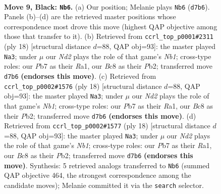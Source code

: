 \documentclass[11pt]{article}
\begin{document}
\clearpage

\begin{figure}[p]\centering
\begin{subfigure}{0.46\textwidth}\centering
\resizebox{\linewidth}{!}{%
\newchessgame
\chessboard[
  setfen={rnb2rk1/pppn1ppp/4p3/3pP3/1q1P2PP/2N5/PPP2P2/1R1QKBNR b K - 0 9},
  showmover=false,
  pgfstyle=straightmove, color=movearrow, markmove={d7-b6}
]}
\caption{}
\end{subfigure}\hfill
\begin{subfigure}{0.46\textwidth}\centering
\resizebox{\linewidth}{!}{%
\newchessgame
\chessboard[
  setfen={1rbqk2r/ppp2ppp/2n1p3/8/QnpP4/5NP1/PP2PPBP/RN3RK1 w k - 2 10},
  showmover=false,
  pgfstyle=straightmove, color=movearrow, markmove={b1-a3}
]}
\caption{}
\end{subfigure}
\\[4pt]
\begin{subfigure}{0.46\textwidth}\centering
\resizebox{\linewidth}{!}{%
\newchessgame
\chessboard[
  setfen={1rbqk2r/ppp2ppp/2n1p3/8/QnpP4/5NP1/PP2PPBP/RN3RK1 w k - 2 10},
  showmover=false,
  pgfstyle=straightmove, color=movearrow, markmove={b1-a3}
]}
\caption{}
\end{subfigure}\hfill
\begin{subfigure}{0.46\textwidth}\centering
\resizebox{\linewidth}{!}{%
\newchessgame
\chessboard[
  setfen={1rbqk2r/ppp2ppp/2n1p3/8/QnpP4/5NP1/PP2PPBP/RN3RK1 w k - 2 10},
  showmover=false,
  pgfstyle=straightmove, color=movearrow, markmove={b1-a3}
]}
\caption{}
\end{subfigure}
\caption{\textbf{Move 9, Black: \texttt{Nb6}.} (a) Our position; Melanie plays \texttt{Nb6} (\texttt{d7b6}). Panels (b)--(d) are the retrieved master positions whose correspondence most drove this move (highest QAP objective among those that transfer to it). (b) Retrieved from \texttt{ccrl\_top\_p0001\#2311} (ply 18) [structural distance $d$=88, QAP obj=93]: the master played \texttt{Na3}; under $\mu$ our \emph{Nd2} plays the role of that game's \emph{Nb1}; cross-type roles: our \emph{P}b7 as their \emph{R}a1, our \emph{B}c8 as their \emph{P}b2; transferred move \texttt{d7b6} \textbf{(endorses this move)}. (c) Retrieved from \texttt{ccrl\_top\_p0002\#1576} (ply 18) [structural distance $d$=88, QAP obj=93]: the master played \texttt{Na3}; under $\mu$ our \emph{Nd2} plays the role of that game's \emph{Nb1}; cross-type roles: our \emph{P}b7 as their \emph{R}a1, our \emph{B}c8 as their \emph{P}b2; transferred move \texttt{d7b6} \textbf{(endorses this move)}. (d) Retrieved from \texttt{ccrl\_top\_p0002\#1577} (ply 18) [structural distance $d$=88, QAP obj=93]: the master played \texttt{Na3}; under $\mu$ our \emph{Nd2} plays the role of that game's \emph{Nb1}; cross-type roles: our \emph{P}b7 as their \emph{R}a1, our \emph{B}c8 as their \emph{P}b2; transferred move \texttt{d7b6} \textbf{(endorses this move)}. Synthesis: 5 retrieved analogs transferred to \texttt{Nb6} (summed QAP objective 464, the strongest correspondence among the candidate moves); Melanie committed it via the \texttt{search} selector.}
\label{fig:thought-m17}
\end{figure}
\end{document}
